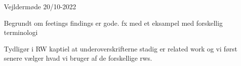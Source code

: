 


















Vejldermøde 20/10-2022

Begrundt om feetings findings er gode. fx med et eksampel med forskellig terminologi




Tydligør i RW kaptiel at underoverskrifterne stadig er related work og vi først senere vælger hvad vi bruger af de forskellige rws.

